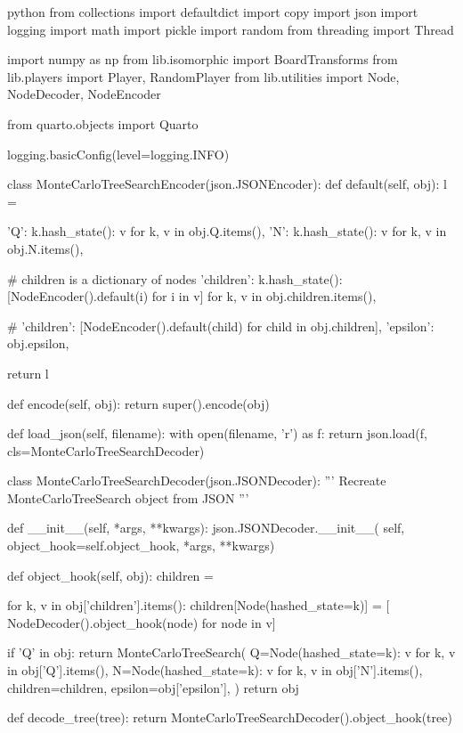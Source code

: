 \begin{mintedbox}{python}
from collections import defaultdict
import copy
import json
import logging
import math
import pickle
import random
from threading import Thread

import numpy as np
from lib.isomorphic import BoardTransforms
from lib.players import Player, RandomPlayer
from lib.utilities import Node, NodeDecoder, NodeEncoder

from quarto.objects import Quarto

logging.basicConfig(level=logging.INFO)


class MonteCarloTreeSearchEncoder(json.JSONEncoder):
    def default(self, obj):
        l = {
            'Q': {k.hash_state(): v for k, v in obj.Q.items()},
            'N': {k.hash_state(): v for k, v in obj.N.items()},

            # children is a dictionary of nodes
            'children': {k.hash_state(): [NodeEncoder().default(i) for i in v] for k, v in obj.children.items()},

            # 'children': [NodeEncoder().default(child) for child in obj.children],
            'epsilon': obj.epsilon,
        }
        return l

    def encode(self, obj):
        return super().encode(obj)

    def load_json(self, filename):
        with open(filename, 'r') as f:
            return json.load(f, cls=MonteCarloTreeSearchDecoder)


class MonteCarloTreeSearchDecoder(json.JSONDecoder):
    '''
    Recreate MonteCarloTreeSearch object from JSON
    '''

    def __init__(self, *args, **kwargs):
        json.JSONDecoder.__init__(
            self, object_hook=self.object_hook, *args, **kwargs)

    def object_hook(self, obj):
        children = {}

        for k, v in obj['children'].items():
            children[Node(hashed_state=k)] = [
                NodeDecoder().object_hook(node) for node in v]

        if 'Q' in obj:
            return MonteCarloTreeSearch(
                Q={Node(hashed_state=k): v for k, v in obj['Q'].items()},
                N={Node(hashed_state=k): v for k, v in obj['N'].items()},
                children=children,
                epsilon=obj['epsilon'],
            )
        return obj


def decode_tree(tree):
    return MonteCarloTreeSearchDecoder().object_hook(tree)



\end{mintedbox}
